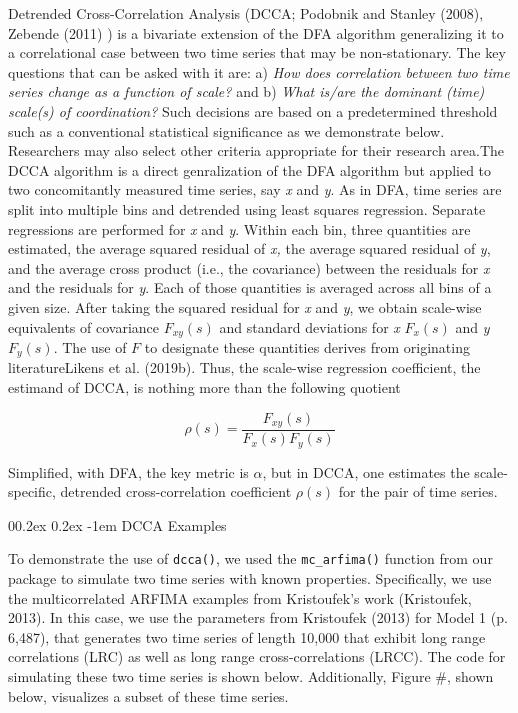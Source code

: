 \documentclass[
  man]{apa6}
\makeatletter
\let\oldparagraph\paragraph
\renewcommand{\paragraph}[1]{\oldparagraph{#1}\mbox{}}
\renewcommand{\paragraph}{\@startsection{paragraph}{4}{\parindent}%
  {0\baselineskip \@plus 0.2ex \@minus 0.2ex}%
  {-1em}%
  {\normalfont\normalsize\bfseries\itshape\typesectitle}}
\makeatother
\begin{document}
Detrended Cross-Correlation Analysis (DCCA;
Podobnik and Stanley (2008),
Zebende (2011) ) is a bivariate extension
of the DFA algorithm generalizing it to a correlational case between two
time series that may be non-stationary. The key questions that can be
asked with it are: a) \emph{How does correlation between two time series
change as a function of scale?} and b) \emph{What is/are the dominant (time)
scale(s) of coordination?} Such decisions are based on a predetermined
threshold such as a conventional statistical significance as we
demonstrate below. Researchers may also select other criteria
appropriate for their research area.The DCCA algorithm is a direct
genralization of the DFA algorithm but applied to two concomitantly
measured time series, say \emph{x} and \emph{y}. As in DFA, time series are split
into multiple bins and detrended using least squares regression.
Separate regressions are performed for \emph{x} and \emph{y}. Within each bin,
three quantities are estimated, the average squared residual of \emph{x,} the
average squared residual of \emph{y}, and the average cross product (i.e.,
the covariance) between the residuals for \emph{x} and the residuals for \emph{y}.
Each of those quantities is averaged across all bins of a given size.
After taking the squared residual for \emph{x} and \emph{y}, we obtain scale-wise
equivalents of covariance \(F_{xy}(s)\) and standard deviations for \emph{x}
\(F_x(s)\) and \emph{y} \(F_y(s)\). The use of \(F\) to designate these quantities
derives from originating literatureLikens et al. (2019b). Thus,
the scale-wise regression coefficient, the estimand of DCCA, is nothing
more than the following quotient

\[\rho(s)=\frac{F_{xy}(s)}{F_x(s)F_y(s)}\]

Simplified, with DFA, the key metric is \(\alpha\), but in DCCA, one
estimates the scale-specific, detrended cross-correlation coefficient
\(\rho(s)\) for the pair of time series.

\hypertarget{dcca-examples}{%
\paragraph{DCCA Examples}\label{dcca-examples}}

To demonstrate the use of \texttt{dcca()}, we used the \texttt{mc\_arfima()} function
from our package to simulate two time series with known properties.
Specifically, we use the multicorrelated ARFIMA examples from
Kristoufek's work (Kristoufek, 2013). In
this case, we use the parameters from Kristoufek (2013) for Model 1 (p.
6,487), that generates two time series of length 10,000 that exhibit
long range correlations (LRC) as well as long range cross-correlations
(LRCC). The code for simulating these two time series is shown below.
Additionally, Figure \#, shown below, visualizes a subset of these time
series.
\end{document}
